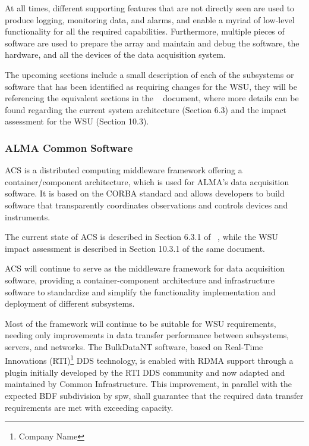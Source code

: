 At all times, different supporting features that are not directly seen are used to produce logging, monitoring data, and alarms, and enable a myriad of low-level functionality for all the required capabilities. Furthermore, multiple pieces of software are used to prepare the array and maintain and debug the software, the hardware, and all the devices of the data acquisition system.

The upcoming sections include a small description of each of the subsystems or software that has been identified as requiring changes for the WSU, they will be referencing the equivalent sections in the ~\cite{CSA-IA} document, where more details can be found regarding the current system architecture (Section 6.3) and the impact assessment for the WSU (Section 10.3).

\subsubsection{ALMA Common Software}
ACS is a distributed computing middleware framework offering a container/component architecture, which is used for ALMA's data acquisition software. It is based on the CORBA standard and allows developers to build software that transparently coordinates observations and controls devices and instruments.

The current state of ACS is described in Section 6.3.1 of ~\cite{CSA-IA}, while the WSU impact assessment is described in Section 10.3.1 of the same document.

\ac{ACS} will continue to serve as the middleware framework for data acquisition software, providing a container-component architecture and infrastructure software to standardize and simplify the functionality implementation and deployment of different subsystems.

Most of the framework will continue to be suitable for WSU requirements, needing only improvements in data transfer performance between subsystems, servers, and networks. The BulkDataNT software, based on Real-Time Innovations (RTI)\footnote{Company Name} \ac{DDS} technology, is enabled with \ac{RDMA} support through a plugin initially developed by the RTI DDS community and now adapted and maintained by Common Infrastructure. This improvement, in parallel with the expected \ac{BDF} subdivision by \ac{spw}, shall guarantee that the required data transfer requirements are met with exceeding capacity.

